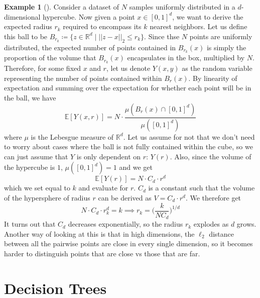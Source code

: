 \documentclass{article}
\theoremstyle{definition}
\newtheorem{example}{Example}[section]
\begin{document}
  \begin{example}[]
      Consider a dataset of $N$ samples uniformly distributed in a $d$-dimensional hypercube. Now given a point $x \in [0, 1]^d$, we want to derive the expected radius $r_k$ required to encompass its $k$ nearest neighbors. Let us define this ball to be $B_{r_k} \coloneqq \{ z \in \mathbb{R}^d \mid ||z - x ||_2 \leq r_k \}$. Since thse $N$ points are uniformly distributed, the expected number of points contained in $B_{r_k} (x)$ is simply the proportion of the volume that $B_{r_k} (x)$ encapsulates in the box, multiplied by $N$. Therefore, for some fixed $x$ and $r$, let us denote $Y(x, y)$ as the random variable representing the number of points contained within $B_r (x)$. By linearity of expectation and summing over the expectation for whether each point will be in the ball, we have 
      \[\mathbb{E}[Y (x, r)] = N \cdot \frac{\mu(B_r (x) \cap [0, 1]^d) }{\mu([0, 1]^d)}\]
      where $\mu$ is the Lebesgue measure of $\mathbb{R}^d$. Let us assume for not that we don't need to worry about cases where the ball is not fully contained within the cube, so we can just assume that $Y$ is only dependent on $r$: $Y(r)$. Also, since the volume of the hypercube is $1$,  $\mu([0, 1]^d) = 1$ and we get 
      \[\mathbb{E}[Y(r)] = N \cdot C_d \cdot r^d\]
      which we set equal to $k$ and evaluate for $r$. $C_d$ is a constant such that the volume of the hypersphere of radius $r$ can be derived as $V = C_d \cdot r^d$. We therefore get 
      \[N \cdot C_d \cdot r_k^d = k \implies r_k = \bigg( \frac{k}{N C_d} \bigg)^{1/d}\]
      It turns out that $C_d$ decreases exponentially, so the radius $r_k$ explodes as $d$ grows. Another way of looking at this is that in high dimensions, the $\ell_2$ distance between all the pairwise points are close in every single dimension, so it becomes harder to distinguish points that are close vs those that are far.  
  \end{example} 

\section{Decision Trees}
\end{document}
